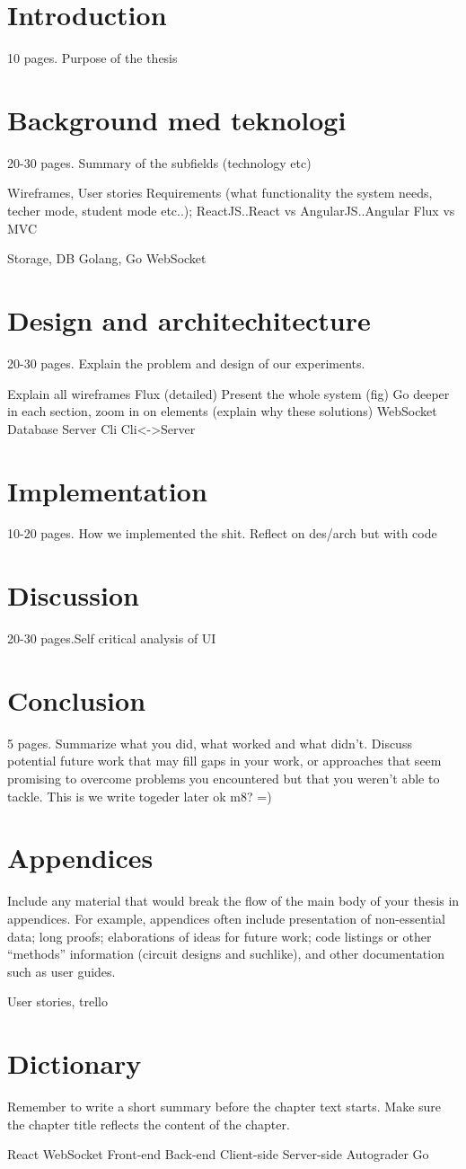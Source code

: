 \documentclass[12pt, a4paper]{report}
\begin{document}
\section{Introduction}
10 pages. Purpose of the thesis

\section{Background med teknologi}
20-30 pages. Summary of the subfields (technology etc)

Wireframes, User stories
Requirements (what functionality the system needs, techer mode, student mode etc..);
ReactJS..React vs AngularJS..Angular
Flux vs MVC

Storage, DB
Golang, Go
WebSocket

\section{Design and architechitecture}
20-30 pages. Explain the problem and design of our experiments.

Explain all wireframes
Flux (detailed)
Present the whole system (fig)
 Go deeper in each section, zoom in on elements (explain why these solutions)
WebSocket
Database
Server
Cli
Cli<->Server

\section{Implementation}
10-20 pages. How we implemented the shit.
Reflect on des/arch but with code

\section{Discussion}
20-30 pages.Self critical analysis of UI

\section{Conclusion}
5 pages. Summarize what you did, what worked and what didn’t.
Discuss potential future work that may fill gaps in your work, or approaches that
seem promising to overcome problems you encountered but that you weren’t able
to tackle.
This is we write togeder later ok m8? =)

\section{Appendices}
Include any material that would break the flow of the main body
of your thesis in appendices. For example, appendices often include presentation
of non-essential data; long proofs; elaborations of ideas for future work; code
listings or other “methods” information (circuit designs and suchlike), and other
documentation such as user guides.

User stories, trello

\section{Dictionary}

Remember to write a short summary before the chapter text starts. 
Make sure the chapter title reflects the content of the chapter.

React
WebSocket
Front-end
Back-end
Client-side
Server-side
Autograder
Go
\end{document}
